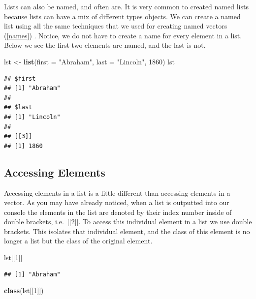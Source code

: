 \documentclass[
]{book}
\newenvironment{Shaded}{\begin{snugshade}}{\end{snugshade}}
\newcommand{\DataTypeTok}[1]{\textcolor[rgb]{0.13,0.29,0.53}{#1}}
\newcommand{\DecValTok}[1]{\textcolor[rgb]{0.00,0.00,0.81}{#1}}
\newcommand{\KeywordTok}[1]{\textcolor[rgb]{0.13,0.29,0.53}{\textbf{#1}}}
\newcommand{\NormalTok}[1]{#1}
\newcommand{\StringTok}[1]{\textcolor[rgb]{0.31,0.60,0.02}{#1}}
\begin{document}
Lists can also be named, and often are. It is very common to created named lists because lists can have a mix of different types objects. We can create a named list using all the same techniques that we used for creating named vectors (\ref{names}) . Notice, we do not have to create a name for every element in a list. Below we see the first two elements are named, and the last is not.

\begin{Shaded}
\begin{Highlighting}[]
\NormalTok{lst <-}\StringTok{ }\KeywordTok{list}\NormalTok{(}\DataTypeTok{first =} \StringTok{"Abraham"}\NormalTok{, }\DataTypeTok{last =} \StringTok{"Lincoln"}\NormalTok{, }\DecValTok{1860}\NormalTok{)}
\NormalTok{lst}
\end{Highlighting}
\end{Shaded}

\begin{verbatim}
## $first
## [1] "Abraham"
## 
## $last
## [1] "Lincoln"
## 
## [[3]]
## [1] 1860
\end{verbatim}

\hypertarget{accessing-elements-1}{%
\subsection{Accessing Elements}\label{accessing-elements-1}}

Accessing elements in a list is a little different than accessing elements in a vector. As you may have already noticed, when a list is outputted into our console the elements in the list are denoted by their index number inside of double brackets, i.e.~{[}{[}2{]}{]}. To access this individual element in a list we use double brackets. This isolates that individual element, and the class of this element is no longer a list but the class of the original element.

\begin{Shaded}
\begin{Highlighting}[]
\NormalTok{lst[[}\DecValTok{1}\NormalTok{]]}
\end{Highlighting}
\end{Shaded}

\begin{verbatim}
## [1] "Abraham"
\end{verbatim}

\begin{Shaded}
\begin{Highlighting}[]
\KeywordTok{class}\NormalTok{(lst[[}\DecValTok{1}\NormalTok{]])}
\end{Highlighting}
\end{Shaded}
\end{document}
